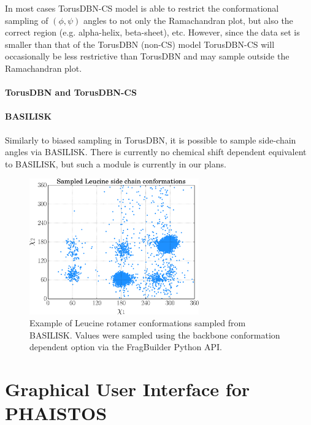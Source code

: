 In most cases TorusDBN-CS model is able to restrict the conformational sampling of $(\phi, \psi)$ angles to not only the Ramachandran plot, but also the correct region (e.g. alpha-helix, beta-sheet), etc.
However, since the data set is smaller than that of the TorusDBN (non-CS) model TorusDBN-CS will occasionally be less restrictive than TorusDBN and may sample outside the Ramachandran plot.



\subsubsection{TorusDBN and TorusDBN-CS}


\subsubsection{BASILISK}

Similarly to biased sampling in TorusDBN, it is possible to sample side-chain angles via BASILISK. There is currently no chemical shift dependent equivalent to BASILISK, but such a module is currently in our plans.


\begin{figure}
    \centering
    \includegraphics[width=0.65\textwidth]{figures/leu_sc.pdf}
    \caption{Example of Leucine rotamer conformations sampled from BASILISK. Values were sampled using the backbone conformation dependent option via the FragBuilder Python API.}
    \label{fig:leu_sc}
\end{figure}





\chapter{Graphical User Interface for PHAISTOS}

